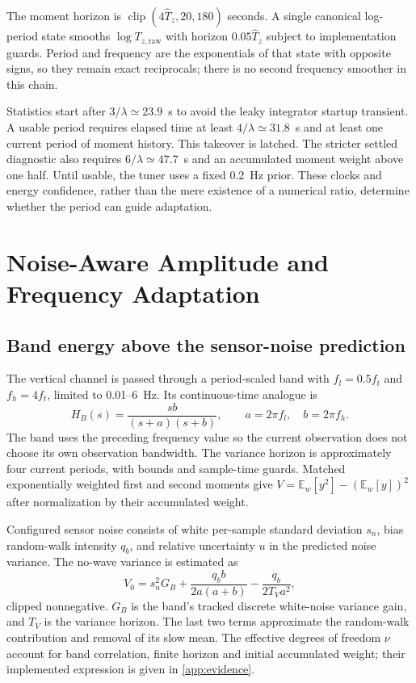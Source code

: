 \documentclass[conference]{IEEEtran}
\newcommand{\E}{\mathbb E}
\DeclareMathOperator{\clip}{clip}
\begin{document}
The moment horizon is
$\clip(4\hat T_z,20,180)$ seconds. A single canonical log-period state
smooths $\log T_{z,\mathrm{raw}}$ with horizon $0.05\hat T_z$ subject to
implementation guards. Period and frequency are the exponentials of that
state with opposite signs, so they remain exact reciprocals; there is no
second frequency smoother in this chain.

Statistics start after $3/\lambda\simeq23.9$~s to avoid the leaky
integrator startup transient. A usable period requires elapsed time at
least $4/\lambda\simeq31.8$~s and at least one current period of moment
history. This takeover is latched. The stricter settled diagnostic also
requires $6/\lambda\simeq47.7$~s and an accumulated moment weight above
one half. Until usable, the tuner uses a fixed 0.2~Hz prior. These clocks
and energy confidence, rather than the mere existence of a numerical
ratio, determine whether the period can guide adaptation.

\section{Noise-Aware Amplitude and Frequency Adaptation}
\label{sec:adapt}
\subsection{Band energy above the sensor-noise prediction}
The vertical channel is passed through a period-scaled band with
$f_l=0.5 f_t$ and $f_h=4f_t$, limited to 0.01--6~Hz. Its continuous-time
analogue is
\begin{equation}
 H_B(s)=\frac{s b}{(s+a)(s+b)},\qquad a=2\pi f_l,\quad b=2\pi f_h.
 \label{eq:band}
\end{equation}
The band uses the preceding frequency value so the current observation
does not choose its own observation bandwidth. The variance horizon is
approximately four current periods, with bounds and sample-time guards.
Matched exponentially weighted first and second moments give
$V=\E_w[y^2]-(\E_w[y])^2$ after normalization by their accumulated weight.

Configured sensor noise consists of white per-sample standard deviation
$s_n$, bias random-walk intensity $q_b$, and relative uncertainty $u$ in
the predicted noise variance. The no-wave variance is estimated as
\begin{equation}
 V_0=s_n^2G_B+
 \frac{q_b b}{2a(a+b)}-\frac{q_b}{2T_Va^2},
 \label{eq:V0}
\end{equation}
clipped nonnegative. $G_B$ is the band's tracked discrete white-noise
variance gain, and $T_V$ is the variance horizon. The last two terms
approximate the random-walk contribution and removal of its slow mean.
The effective degrees of freedom $\nu$ account for band correlation,
finite horizon and initial accumulated weight; their implemented expression
is given in \cref{app:evidence}.
\end{document}
